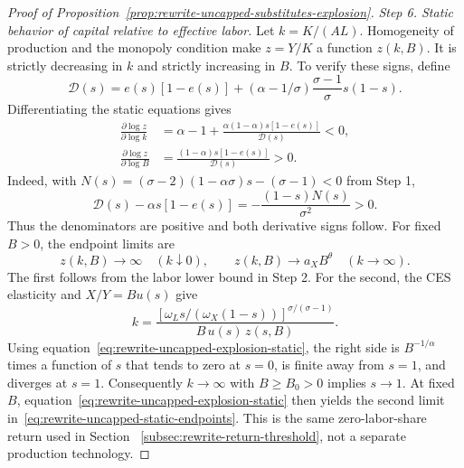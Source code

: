 \begin{proof}[Proof of Proposition~\ref{prop:rewrite-uncapped-substitutes-explosion}]
\textit{Step 6. Static behavior of capital relative to effective labor.}
Let $k=K/(AL)$. Homogeneity of production and the monopoly condition
make $z=Y/K$ a function $z(k,B)$. It is strictly decreasing in $k$
and strictly increasing in $B$. To verify these signs, define
\[
 \mathcal D(s)=e(s)[1-e(s)]
   +(\alpha-1/\sigma)\frac{\sigma-1}{\sigma}s(1-s).
\]
Differentiating the static equations gives
\begin{align}
 \frac{\partial\log z}{\partial\log k}
 &=\alpha-1+
 \frac{\alpha(1-\alpha)s[1-e(s)]}{\mathcal D(s)}<0,\nonumber\\
 \frac{\partial\log z}{\partial\log B}
 &=\frac{(1-\alpha)s[1-e(s)]}{\mathcal D(s)}>0.
 \label{eq:rewrite-uncapped-static-monotonicity}
\end{align}
Indeed, with $N(s)=(\sigma-2)(1-\alpha\sigma)s-(\sigma-1)<0$
from Step 1,
\[
 \mathcal D(s)-\alpha s[1-e(s)]
 =-\frac{(1-s)N(s)}{\sigma^2}>0.
\]
Thus the denominators are positive and both derivative signs follow.
For fixed $B>0$, the endpoint limits are
\begin{equation}
 z(k,B)\to\infty\quad(k\downarrow0),\qquad
 z(k,B)\to a_XB^\theta\quad(k\to\infty).
 \label{eq:rewrite-uncapped-static-endpoints}
\end{equation}
The first follows from the labor lower bound in Step 2. For the second,
the CES elasticity and $X/Y=Bu(s)$ give
\[
 k=\frac{[\omega_Ls/(\omega_X(1-s))]^{\sigma/(\sigma-1)}}
 {B\,u(s)\,z(s,B)}.
\]
Using equation~\eqref{eq:rewrite-uncapped-explosion-static}, the right side
is $B^{-1/\alpha}$ times a function of $s$ that tends to zero at $s=0$,
is finite away from $s=1$, and diverges at $s=1$.
Consequently $k\to\infty$ with $B\geq B_0>0$ implies $s\to1$.
At fixed $B$, equation~\eqref{eq:rewrite-uncapped-explosion-static}
then yields the second limit in~\eqref{eq:rewrite-uncapped-static-endpoints}.
This is the same zero-labor-share return used in Section~
\ref{subsec:rewrite-return-threshold}, not a separate production technology.


\end{proof}
